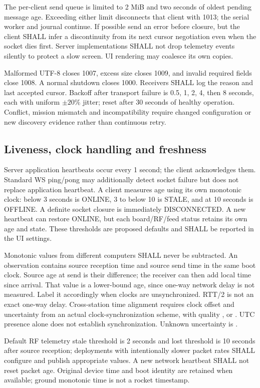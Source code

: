 The per-client send queue is limited to 2 MiB and two seconds of oldest pending
message age. Exceeding either limit disconnects that client with 1013; the serial
worker and journal continue. If possible send an error before closure, but the
client SHALL infer a discontinuity from its next cursor negotiation even when
the socket dies first. Server implementations SHALL not drop telemetry events
silently to protect a slow screen. UI rendering may coalesce its own copies.

Malformed UTF-8 closes 1007, excess size closes 1009, and invalid required fields
close 1008. A normal shutdown closes 1000. Receivers SHALL log the reason and last
accepted cursor. Backoff after transport failure is 0.5, 1, 2, 4, then 8 seconds,
each with uniform $\pm20\%$ jitter; reset after 30 seconds of healthy operation.
Conflict, mission mismatch and incompatibility require changed configuration or
new discovery evidence rather than continuous retry.

\subsection{Liveness, clock handling and freshness}
Server application heartbeats occur every 1 second; the client acknowledges
them. Standard WS ping/pong may additionally detect socket failure but does not
replace application heartbeat. A client measures age using its own monotonic
clock: below 3 seconds is ONLINE, 3 to below 10 is STALE, and at 10 seconds is
OFFLINE. A definite socket closure is immediately DISCONNECTED. A new heartbeat
can restore ONLINE, but each board/RF/feed status retains its own age and state.
These thresholds are proposed defaults and SHALL be reported in the UI settings.

Monotonic values from different computers SHALL never be subtracted. An
observation contains source reception time and source send time in the same boot
clock. Source age at send is their difference; the receiver can then add local
time since arrival. That value is a lower-bound age, since one-way network delay
is not measured. Label it accordingly when clocks are unsynchronized. RTT/2 is
not an exact one-way delay. Cross-station time alignment requires clock offset
and uncertainty from an actual clock-synchronization scheme, with quality
,  or . UTC presence alone
does not establish synchronization. Unknown uncertainty is .

Default RF telemetry stale threshold is 2 seconds and lost threshold is 10
seconds after source reception; deployments with intentionally slower packet
rates SHALL configure and publish appropriate values. A new network heartbeat
SHALL not reset packet age. Original device time and boot identity are retained
when available; ground monotonic time is not a rocket timestamp.

